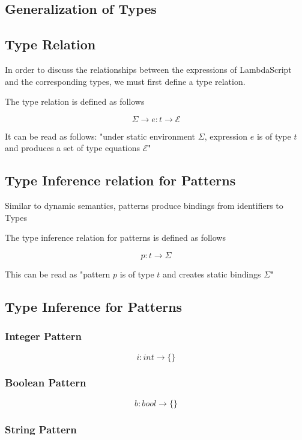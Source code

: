 \documentclass[titlepage]{article}
\begin{document}
\subsection{Generalization of Types}

\subsection{Type Relation}

In order to discuss the relationships between the expressions of LambdaScript and the corresponding types, we must first define a type relation.

The type relation is defined as follows

$$\Sigma \rightarrow e : t \rightarrow \mathcal{E}$$

It can be read as follows: "under static environment $\Sigma$, expression $e$ is of type $t$ and produces a set of type equations $\mathcal{E}$"

\subsection{Type Inference relation for Patterns}

Similar to dynamic semantics, patterns produce bindings from identifiers to Types

The type inference relation for patterns is defined as follows

$$p : t \rightarrow \Sigma$$

This can be read as "pattern $p$ is of type $t$ and creates static bindings $\Sigma$"

\subsection{Type Inference for Patterns}

\subsubsection{Integer Pattern}

$$i : int \rightarrow \{\}$$

\subsubsection{Boolean Pattern}

$$b : bool \rightarrow \{\}$$

\subsubsection{String Pattern}
\end{document}
